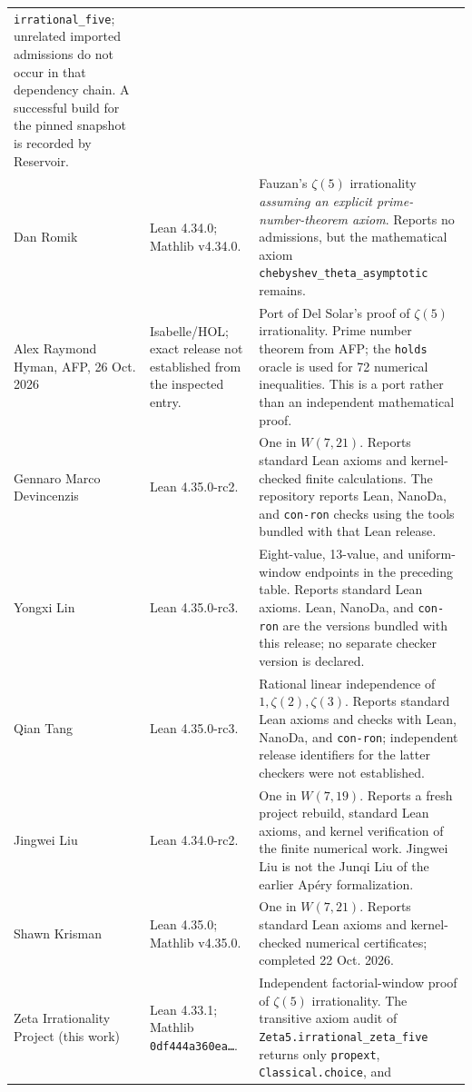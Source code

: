 \documentclass[11pt,letterpaper]{article}
\theoremstyle{definition}
\begin{document}
\begin{longtable}{@{}>{\raggedright\arraybackslash}p{}>{\raggedright\arraybackslash}p{}>{\raggedright\arraybackslash}p{}@{}}
\texttt{irrational\_five}; unrelated imported admissions do not occur in
that dependency chain.  A successful build for the pinned snapshot is
recorded by Reservoir.\\
Dan Romik \cite{romik2026} & Lean 4.34.0; Mathlib v4.34.0. & Fauzan's
$\zeta(5)$ irrationality \emph{assuming an explicit prime-number-theorem
axiom}.  Reports no admissions, but the mathematical axiom
\texttt{chebyshev\_theta\_asymptotic} remains.\\
Alex Raymond Hyman, AFP, 26 Oct. 2026 \cite{hyman2026} & Isabelle/HOL;
exact release not established from the inspected entry. & Port of
Del Solar's proof of $\zeta(5)$ irrationality.  Prime number theorem from
AFP; the \texttt{holds} oracle is used for 72 numerical inequalities.
This is a port rather than an independent mathematical proof.\\
Gennaro Marco Devincenzis \cite{devincenzis2026} & Lean 4.35.0-rc2. &
One in $W(7,21)$.  Reports standard Lean axioms and kernel-checked finite
calculations.  The repository reports Lean, NanoDa, and \texttt{con-ron}
checks using the tools bundled with that Lean release.\\
Yongxi Lin \cite{lin2026} & Lean 4.35.0-rc3. & Eight-value, 13-value,
and uniform-window endpoints in the preceding table.  Reports standard
Lean axioms.  Lean, NanoDa, and \texttt{con-ron} are the versions bundled
with this release; no separate checker version is declared.\\
Qian Tang \cite{tang2026} & Lean 4.35.0-rc3. & Rational linear
independence of $1,\zeta(2),\zeta(3)$.  Reports standard Lean axioms and
checks with Lean, NanoDa, and \texttt{con-ron}; independent release
identifiers for the latter checkers were not established.\\
Jingwei Liu \cite{jingweiliu2026} & Lean 4.34.0-rc2. & One in
$W(7,19)$.  Reports a fresh project rebuild, standard Lean axioms, and
kernel verification of the finite numerical work.  Jingwei Liu is not
the Junqi Liu of the earlier Ap\'ery formalization.\\
Shawn Krisman \cite{krisman2026} & Lean 4.35.0; Mathlib v4.35.0. &
One in $W(7,21)$.  Reports standard Lean axioms and kernel-checked
numerical certificates; completed 22 Oct. 2026. \\
Zeta Irrationality Project (this work) \cite{zeta5lean2026}
& Lean 4.33.1; Mathlib \texttt{0df444a360ea\ldots}.
& Independent factorial-window proof of $\zeta(5)$ irrationality.
The transitive axiom audit of \texttt{Zeta5.irrational\_zeta\_five}
returns only \texttt{propext}, \texttt{Classical.choice}, and

\end{longtable}
\end{document}
